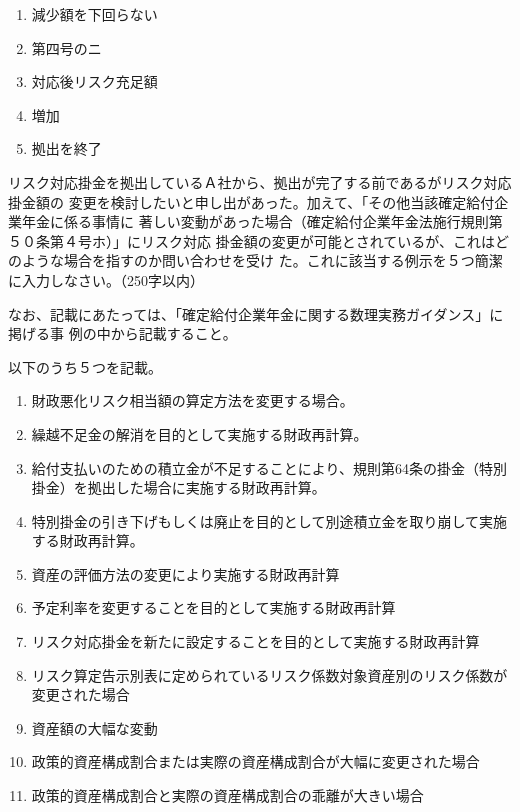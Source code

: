 \begin{answerbox}
  \begin{enumerate}[A: ]
    \item 減少額を下回らない
    \item 第四号のニ
    \item 対応後リスク充足額
    \item 増加
    \item 拠出を終了
  \end{enumerate}
\end{answerbox}

\begin{shortanswer}[年金2 2023 問題2(3)]
  リスク対応掛金を拠出しているＡ社から、拠出が完了する前であるがリスク対応掛金額の
変更を検討したいと申し出があった。加えて、「その他当該確定給付企業年金に係る事情に
著しい変動があった場合（確定給付企業年金法施行規則第５０条第４号ホ）」にリスク対応
掛金額の変更が可能とされているが、これはどのような場合を指すのか問い合わせを受け
た。これに該当する例示を５つ簡潔に入力しなさい。（250字以内）

なお、記載にあたっては、「確定給付企業年金に関する数理実務ガイダンス」に掲げる事
例の中から記載すること。
\end{shortanswer}

\begin{answerbox}
  以下のうち５つを記載。
  \begin{enumerate}
    \item 財政悪化リスク相当額の算定方法を変更する場合。
    \item 繰越不足金の解消を目的として実施する財政再計算。
    \item 給付支払いのための積立金が不足することにより、規則第64条の掛金（特別掛金）を拠出した場合に実施する財政再計算。
    \item 特別掛金の引き下げもしくは廃止を目的として別途積立金を取り崩して実施する財政再計算。
    \item 資産の評価方法の変更により実施する財政再計算
    \item 予定利率を変更することを目的として実施する財政再計算
    \item リスク対応掛金を新たに設定することを目的として実施する財政再計算
    \item リスク算定告示別表に定められているリスク係数対象資産別のリスク係数が変更された場合
    \item 資産額の大幅な変動
    \item 政策的資産構成割合または実際の資産構成割合が大幅に変更された場合
    \item 政策的資産構成割合と実際の資産構成割合の乖離が大きい場合
  \end{enumerate}
\end{answerbox}

